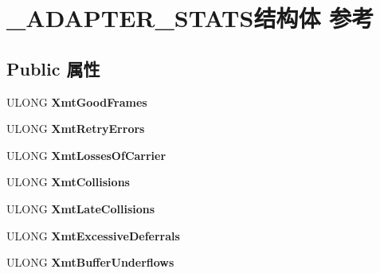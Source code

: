 \hypertarget{struct___a_d_a_p_t_e_r___s_t_a_t_s}{}\section{\+\_\+\+A\+D\+A\+P\+T\+E\+R\+\_\+\+S\+T\+A\+T\+S结构体 参考}
\label{struct___a_d_a_p_t_e_r___s_t_a_t_s}
\subsection*{Public 属性}
\begin{DoxyCompactItemize}
\item 
\mbox{\label{struct___a_d_a_p_t_e_r___s_t_a_t_s_a5fa66860d8dec6348e44c2819bb67292}} 
U\+L\+O\+NG {\bfseries Xmt\+Good\+Frames}
\item 
\mbox{\label{struct___a_d_a_p_t_e_r___s_t_a_t_s_af9650e76b852243d5e1ad63e1013c90e}} 
U\+L\+O\+NG {\bfseries Xmt\+Retry\+Errors}
\item 
\mbox{\label{struct___a_d_a_p_t_e_r___s_t_a_t_s_a2b95229213145cf9ab9342e81b603a75}} 
U\+L\+O\+NG {\bfseries Xmt\+Losses\+Of\+Carrier}
\item 
\mbox{\label{struct___a_d_a_p_t_e_r___s_t_a_t_s_a14ab342c9a0e7b118c5b294cecd01198}} 
U\+L\+O\+NG {\bfseries Xmt\+Collisions}
\item 
\mbox{\label{struct___a_d_a_p_t_e_r___s_t_a_t_s_a9dbb7953a691b085aff770e91449d8f1}} 
U\+L\+O\+NG {\bfseries Xmt\+Late\+Collisions}
\item 
\mbox{\label{struct___a_d_a_p_t_e_r___s_t_a_t_s_ae0551bf78cabddd5db2f1d99e98d9e59}} 
U\+L\+O\+NG {\bfseries Xmt\+Excessive\+Deferrals}
\item 
\mbox{\label{struct___a_d_a_p_t_e_r___s_t_a_t_s_a797807ba92992437af905d1546b4b1b4}} 
U\+L\+O\+NG {\bfseries Xmt\+Buffer\+Underflows}
\item 
\mbox{\label{struct___a_d_a_p_t_e_r___s_t_a_t_s_abd4e8681d7aae0162cb44578cefeac44}} 

\end{DoxyCompactItemize}
